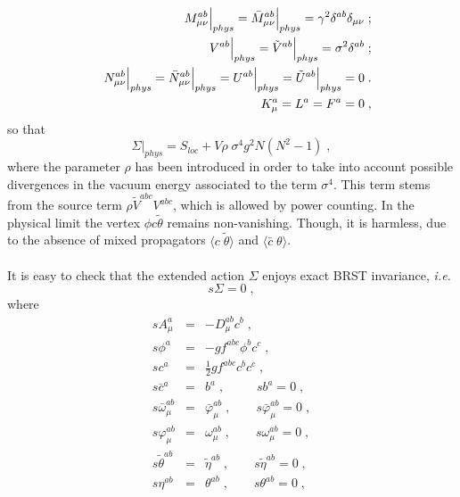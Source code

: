 \begin{appendix}
%
\begin{eqnarray}
\label{physval1}
&&
M^{ab}_{\mu\nu}\Big{|}_{phys}=\bar{M}^{ab}_{\mu\nu}\Big{|}_{phys}=
\gamma^{2}\delta^{ab}\delta_{\mu\nu}
\;;\nonumber \\
&&
V^{ab}\Big{|}_{phys}=\tilde{V}^{ab}\Big{|}_{phys}=
\sigma^{2}\delta^{ab}
\;;\nonumber \\
&&
N^{ab}_{\mu\nu}\Big{|}_{phys}=\bar{N}^{ab}_{\mu\nu}\Big{|}_{phys}=
U^{ab}\Big{|}_{phys}=\tilde{U}^{ab}\Big{|}_{phys}=0
\;. \nonumber\\
&& K^{a}_\mu = L^a = F^a =0 \;, 
\end{eqnarray}
%
so that 
%
\begin{equation} 
\Sigma \Big|_{phys}  = S_{ loc}  + V \rho \;\sigma^4 g^2 N(N^2-1)  \;, \label{limit} 
\end{equation}
%
where the parameter $\rho$ has been introduced in order to take into account possible divergences in the vacuum energy associated to the term $\sigma^4$. This term stems from the source term $\rho\tilde{V}^{abc}V^{abc}$, which  is allowed by power counting. In the physical limit the vertex $\phi c \tilde{\theta}$ remains non-vanishing. Though, it is harmless, due to the absence of mixed propagators $\langle c\; \tilde{\theta}\rangle $ and $\langle {\bar c}\; \theta\rangle $. \\\\It is easy to check that the extended action $\Sigma$ enjoys exact BRST invariance, {\it i.e.} 
%
\begin{equation} 
s \Sigma = 0  \;, \label{sinv}
\end{equation}
%
where
%
\begin{eqnarray}
\label{brst2}
sA^{a}_{\mu} &=& - D^{ab}_{\mu}c^{b}\;,\nonumber \\
s\phi^{a}& = & -gf^{abc}\phi^{b}c^{c} \;,    \nonumber \\
s c^{a} &=& \frac{1}{2}gf^{abc}c^{b}c^{c} \;, \nonumber \\
s{\bar c}^{a} &=& b^{a}\;, \qquad \; \; 
sb^{a} = 0 \;, \nonumber \\
s{\bar \omega}^{ab}_\mu & = & {\bar \varphi}^{ab}_\mu \;, \qquad  s {\bar \varphi}^{ab}_\mu =0\;, \nonumber \\
s { \varphi}^{ab}_\mu&  = & {\omega}^{ab}_\mu  \;, \qquad s {\omega}^{ab}_\mu = 0 \;,  \nonumber \\
s\tilde{\theta}^{ab} & =&  \tilde{\eta}^{ab}\;, \qquad s\tilde{\eta}^{ab} =0\;, \nonumber \\
s\eta^{ab}& = & \theta^{ab}\;, \qquad s\theta^{ab}=0\;, 

\end{eqnarray}
\end{appendix}
